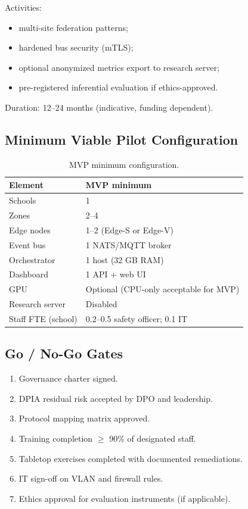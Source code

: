 Activities:
\begin{itemize}[noitemsep]
  \item multi-site federation patterns;
  \item hardened bus security (mTLS);
  \item optional anonymized metrics export to research server;
  \item pre-registered inferential evaluation if ethics-approved.
\end{itemize}

Duration: 12--24 months (indicative, funding dependent).

\subsection{Minimum Viable Pilot Configuration}

\begin{table}[htbp]
  \centering
  \caption{MVP minimum configuration.}
  \label{tab:mvp-config}
  \small
  \begin{tabular}{@{}ll@{}}
    \toprule
    Element & MVP minimum \\
    \midrule
    Schools & 1 \\
    Zones & 2--4 \\
    Edge nodes & 1--2 (Edge-S or Edge-V) \\
    Event bus & 1 NATS/MQTT broker \\
    Orchestrator & 1 host (32 GB RAM) \\
    Dashboard & 1 API + web UI \\
    GPU & Optional (CPU-only acceptable for MVP) \\
    Research server & Disabled \\
    Staff FTE (school) & 0.2--0.5 safety officer; 0.1 IT \\
    \bottomrule
  \end{tabular}
\end{table}

\subsection{Go / No-Go Gates}

\begin{enumerate}[noitemsep]
  \item Governance charter signed.
  \item DPIA residual risk accepted by DPO and leadership.
  \item Protocol mapping matrix approved.
  \item Training completion $\geq$ 90\% of designated staff.
  \item Tabletop exercises completed with documented remediations.
  \item IT sign-off on VLAN and firewall rules.
  \item Ethics approval for evaluation instruments (if applicable).
\end{enumerate}

